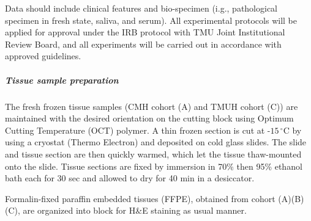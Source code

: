 \documentclass[12pt, a4paper]{article}
\begin{document}
Data should include clinical features and bio-specimen (i.g., pathological specimen in fresh state, saliva, and serum).
All experimental protocols will be applied for approval under the IRB protocol
with TMU Joint Institutional Review Board, and all experiments will be carried out in accordance with approved guidelines.










\subparagraph*{Tissue sample preparation} %

The fresh frozen tissue samples (CMH cohort (A) and TMUH cohort (C)) are maintained with the desired orientation on the cutting block using Optimum Cutting Temperature (OCT) polymer. A thin frozen section is cut at -$15\,^{\circ}\mathrm{C}$ by using a cryostat (Thermo Electron) and deposited on cold glass slides. The slide and tissue section are then quickly warmed, which let the tissue thaw-mounted onto the slide. Tissue sections are fixed by immersion in 70\% then 95\% ethanol bath each for 30 sec and allowed to dry for 40 min in a desiccator.

Formalin-fixed paraffin embedded tissues (FFPE), obtained from cohort (A)(B)(C), are organized into block for H\&E staining as usual manner.
\end{document}
